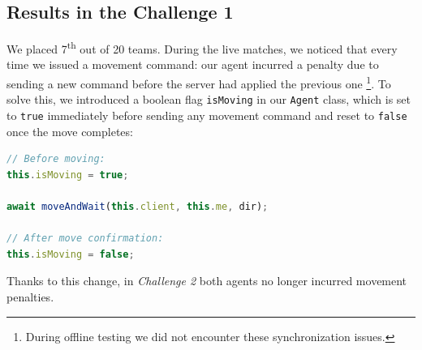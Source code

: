 \subsection{Results in the Challenge 1}

We placed 7\textsuperscript{th} out of 20 teams. During the live matches, we  noticed that every time we issued a movement command: our agent incurred a penalty due to sending a new command before the server had applied the previous one \footnote{During offline testing we did not encounter these synchronization issues.}. To solve this, we introduced a boolean flag \texttt{isMoving} in our \texttt{Agent} class, which is set to \texttt{true} immediately before sending any movement command and reset to \texttt{false} once the move completes:

\begin{lstlisting}[language=JavaScript,caption={Setting \texttt{isMoving} before and after moves}]
// Before moving:
this.isMoving = true;

await moveAndWait(this.client, this.me, dir);

// After move confirmation:
this.isMoving = false;
\end{lstlisting}

Thanks to this change, in \textit{Challenge 2} both agents no longer incurred movement penalties.
